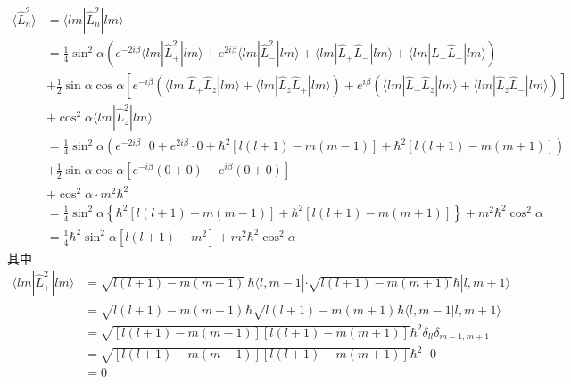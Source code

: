 \begin{equation}
    \begin{aligned}
        \langle \hat{L}_{n}^{2}\rangle &=\langle lm|\hat{L}_{n}^{2}|lm\rangle 
\\
&=\frac{1}{4}\sin ^2\alpha \left( e^{-2i\beta}\langle lm|\hat{L}_{+}^{2}|lm\rangle +e^{2i\beta}\langle lm|\hat{L}_{-}^{2}|lm\rangle +\langle lm|\hat{L}_+\hat{L}_-|lm\rangle +\langle lm|\hat{L}_-\hat{L}_+|lm\rangle \right) 
\\
&+\frac{1}{2}\sin \alpha \cos \alpha \left[ e^{-i\beta}\left( \langle lm|\hat{L}_+\hat{L}_z|lm\rangle +\langle lm|\hat{L}_z\hat{L}_+|lm\rangle \right) +e^{i\beta}\left( \langle lm|\hat{L}_-\hat{L}_z|lm\rangle +\langle lm|\hat{L}_z\hat{L}_-|lm\rangle \right) \right] 
\\
&+\cos ^2\alpha \langle lm|\hat{L}_{z}^{2}|lm\rangle 
\\
&=\frac{1}{4}\sin ^2\alpha \left( e^{-2i\beta}\cdot 0+e^{2i\beta}\cdot 0+\hbar ^2\left[ l\left( l+1 \right) -m\left( m-1 \right) \right] +\hbar ^2\left[ l\left( l+1 \right) -m\left( m+1 \right) \right] \right) 
\\
&+\frac{1}{2}\sin \alpha \cos \alpha \left[ e^{-i\beta}\left( 0+0 \right) +e^{i\beta}\left( 0+0 \right) \right] 
\\
&+\cos ^2\alpha \cdot m^2\hbar ^2
\\
&=\frac{1}{4}\sin ^2\alpha \left\{ \hbar ^2\left[ l\left( l+1 \right) -m\left( m-1 \right) \right] +\hbar ^2\left[ l\left( l+1 \right) -m\left( m+1 \right) \right] \right\} +m^2\hbar ^2\cos ^2\alpha 
\\
&=\frac{1}{4}\hbar ^2\sin ^2\alpha \left[ l\left( l+1 \right) -m^2 \right] +m^2\hbar ^2\cos ^2\alpha 
    \end{aligned}
\end{equation}
其中
\begin{equation}
    \begin{aligned}
        \langle lm|\hat{L}_{+}^{2}|lm\rangle &=\sqrt{l\left( l+1 \right) -m\left( m-1 \right)}\,\hbar \langle l,m-1|\cdot \sqrt{l\left( l+1 \right) -m\left( m+1 \right)}\hbar |l,m+1\rangle 
\\
&=\sqrt{l\left( l+1 \right) -m\left( m-1 \right)}\hbar \sqrt{l\left( l+1 \right) -m\left( m+1 \right)}\hbar \langle l,m-1|l,m+1\rangle 
\\
&=\sqrt{\left[ l\left( l+1 \right) -m\left( m-1 \right) \right] \left[ l\left( l+1 \right) -m\left( m+1 \right) \right]}\hbar ^2\delta _{ll}\delta _{m-1,m+1}
\\
&=\sqrt{\left[ l\left( l+1 \right) -m\left( m-1 \right) \right] \left[ l\left( l+1 \right) -m\left( m+1 \right) \right]}\hbar ^2\cdot 0
\\
&=0
    \end{aligned}
\end{equation}
